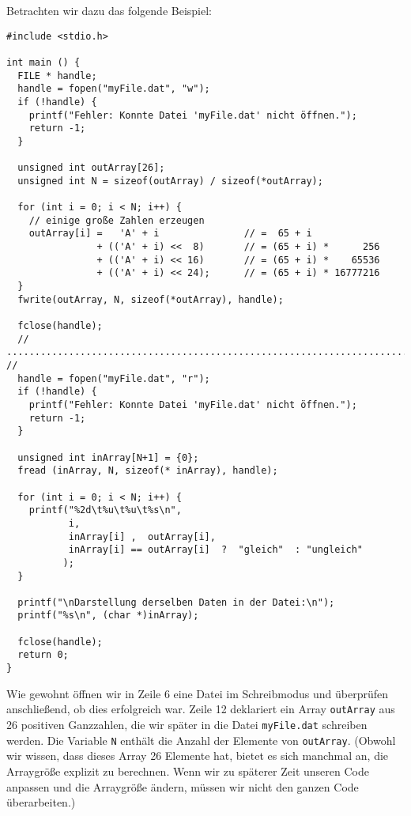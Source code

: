 Betrachten wir dazu das folgende Beispiel:

\begin{codebox}
\begin{verbatim}
#include <stdio.h>

int main () {
  FILE * handle;
  handle = fopen("myFile.dat", "w");
  if (!handle) {
    printf("Fehler: Konnte Datei 'myFile.dat' nicht öffnen.");
    return -1;
  }

  unsigned int outArray[26];
  unsigned int N = sizeof(outArray) / sizeof(*outArray);

  for (int i = 0; i < N; i++) {
    // einige große Zahlen erzeugen
    outArray[i] =   'A' + i               // =  65 + i
                + (('A' + i) <<  8)       // = (65 + i) *      256
                + (('A' + i) << 16)       // = (65 + i) *    65536
                + (('A' + i) << 24);      // = (65 + i) * 16777216
  }
  fwrite(outArray, N, sizeof(*outArray), handle);

  fclose(handle);
  // ....................................................................... //
  handle = fopen("myFile.dat", "r");
  if (!handle) {
    printf("Fehler: Konnte Datei 'myFile.dat' nicht öffnen.");
    return -1;
  }

  unsigned int inArray[N+1] = {0};
  fread (inArray, N, sizeof(* inArray), handle);

  for (int i = 0; i < N; i++) {
    printf("%2d\t%u\t%u\t%s\n",
           i,
           inArray[i] ,  outArray[i],
           inArray[i] == outArray[i]  ?  "gleich"  : "ungleich"
          );
  }

  printf("\nDarstellung derselben Daten in der Datei:\n");
  printf("%s\n", (char *)inArray);

  fclose(handle);
  return 0;
}
\end{verbatim}
\end{codebox}

Wie gewohnt öffnen wir in Zeile 6 eine Datei im Schreibmodus und überprüfen anschließend, ob dies erfolgreich war. Zeile 12 deklariert ein Array \texttt{outArray} aus 26 positiven Ganzzahlen, die wir später in die Datei \texttt{myFile.dat} schreiben werden. Die Variable \texttt{N} enthält die Anzahl der Elemente von \texttt{outArray}. (Obwohl wir wissen, dass dieses Array 26 Elemente hat, bietet es sich manchmal an, die Arraygröße explizit zu berechnen. Wenn wir zu späterer Zeit unseren Code anpassen und die Arraygröße ändern, müssen wir nicht den ganzen Code überarbeiten.)

